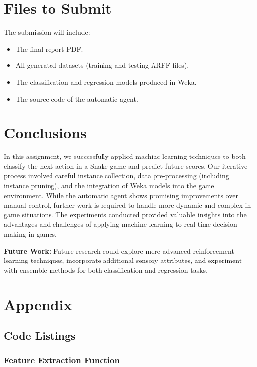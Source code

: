 \documentclass[12pt,a4paper]{article}
\begin{document}
\section{Files to Submit}
The submission will include:
\begin{itemize}
    \item The final report PDF.
    \item All generated datasets (training and testing ARFF files).
    \item The classification and regression models produced in Weka.
    \item The source code of the automatic agent.
\end{itemize}

\section{Conclusions}
In this assignment, we successfully applied machine learning techniques to both classify the next action in a Snake game and predict future scores. Our iterative process involved careful instance collection, data pre-processing (including instance pruning), and the integration of Weka models into the game environment. While the automatic agent shows promising improvements over manual control, further work is required to handle more dynamic and complex in-game situations. The experiments conducted provided valuable insights into the advantages and challenges of applying machine learning to real-time decision-making in games.

\vspace{1em}
\noindent\textbf{Future Work:} Future research could explore more advanced reinforcement learning techniques, incorporate additional sensory attributes, and experiment with ensemble methods for both classification and regression tasks.

\section{Appendix}

\subsection{Code Listings}

\subsubsection{Feature Extraction Function}
\label{sec:feature-extraction}
\end{document}
